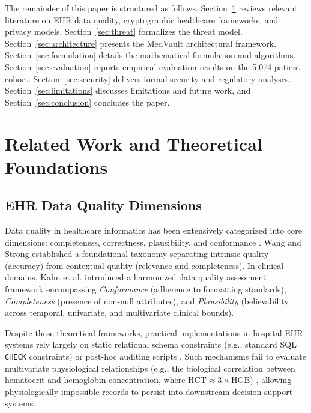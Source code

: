 \documentclass[conference]{IEEEtran}
\begin{document}
The remainder of this paper is structured as follows. Section~\ref{sec:related} reviews relevant literature on EHR data quality, cryptographic healthcare frameworks, and privacy models. Section~\ref{sec:threat} formalizes the threat model. Section~\ref{sec:architecture} presents the MedVault architectural framework. Section~\ref{sec:formulation} details the mathematical formulation and algorithms. Section~\ref{sec:evaluation} reports empirical evaluation results on the 5,074-patient cohort. Section~\ref{sec:security} delivers formal security and regulatory analyses. Section~\ref{sec:limitations} discusses limitations and future work, and Section~\ref{sec:conclusion} concludes the paper.

\section{Related Work and Theoretical Foundations}
\label{sec:related}

\subsection{EHR Data Quality Dimensions}
Data quality in healthcare informatics has been extensively categorized into core dimensions: completeness, correctness, plausibility, and conformance \cite{kahn2016harmonized, weiskopf2013methods}. Wang and Strong \cite{wang1996beyond} established a foundational taxonomy separating intrinsic quality (accuracy) from contextual quality (relevance and completeness). In clinical domains, Kahn et al. \cite{kahn2016harmonized} introduced a harmonized data quality assessment framework encompassing \textit{Conformance} (adherence to formatting standards), \textit{Completeness} (presence of non-null attributes), and \textit{Plausibility} (believability across temporal, univariate, and multivariate clinical bounds). 

Despite these theoretical frameworks, practical implementations in hospital EHR systems rely largely on static relational schema constraints (e.g., standard SQL \texttt{CHECK} constraints) or post-hoc auditing scripts \cite{hersh2013caveats, linzer2019quality}. Such mechanisms fail to evaluate multivariate physiological relationships (e.g., the biological correlation between hematocrit and hemoglobin concentration, where $\text{HCT} \approx 3 \times \text{HGB}$) \cite{britton2016complete}, allowing physiologically impossible records to persist into downstream decision-support systems.
\end{document}
